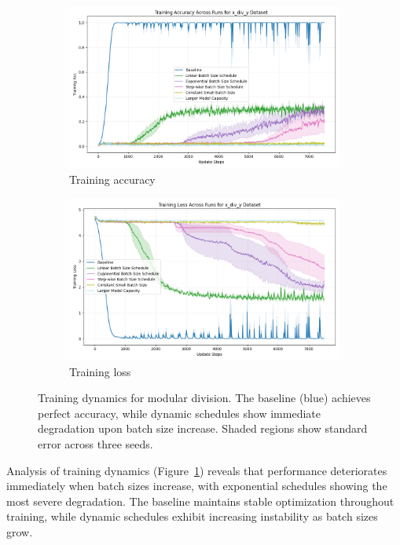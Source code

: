 \documentclass{article} %
\begin{document}
\begin{figure}[h]
    \centering
    \begin{subfigure}{0.49\textwidth}
        \includegraphics[width=\textwidth]{train_acc_x_div_y.png}
        \caption{Training accuracy}
    \end{subfigure}
    \hfill
    \begin{subfigure}{0.49\textwidth}
        \includegraphics[width=\textwidth]{train_loss_x_div_y.png}
        \caption{Training loss}
    \end{subfigure}
    \caption{Training dynamics for modular division. The baseline (blue) achieves perfect accuracy, while dynamic schedules show immediate degradation upon batch size increase. Shaded regions show standard error across three seeds.}
    \label{fig:training-dynamics}
\end{figure}

Analysis of training dynamics (Figure~\ref{fig:training-dynamics}) reveals that performance deteriorates immediately when batch sizes increase, with exponential schedules showing the most severe degradation. The baseline maintains stable optimization throughout training, while dynamic schedules exhibit increasing instability as batch sizes grow.
\end{document}
